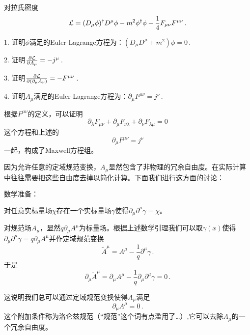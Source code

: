 \documentclass[CJK]{beamer}
\begin{document}
\begin{frame}
\bch
对拉氏密度
$${\mathcal{L}} = (D_\mu\phi)^\dagger D^\mu\phi - m^2\phi^\dagger \phi - \frac{1}{4} F_{\mu\nu}F^{\mu\nu} \,.$$

1. 证明$\phi$满足的Euler-Lagrange方程为：$(D_\mu D^\mu + m^2)\phi = 0\,$.

2. 证明$\frac{\partial{\mathcal{L}}}{\partial A_\mu} = - j^\mu\,$.

3. 证明$\frac{\partial{\mathcal{L}}}{\partial (\partial_\mu A_\nu)} = - F^{\mu\nu}\,$.

4. 证明$A_\mu$满足的Euler-Lagrange方程为：$\partial_\mu F^{\mu\nu} = j^\nu\,$.
\ech
\end{frame}


\begin{frame}
\bch
根据$F^{\mu\nu}$的定义，可以证明
$$\partial_\lambda F_{\mu\nu} + \partial_\mu F_{\nu\lambda} + \partial_\nu F_{\lambda\mu} = 0$$
这个方程和上述的
$$\partial_\mu F^{\mu\nu} = j^\nu $$
一起，构成了Maxwell方程组。
\ech
\end{frame}


\begin{frame}
\bch

因为允许任意的定域规范变换，$A_\mu$显然包含了非物理的冗余自由度。在实际计算中往往需要把这些自由度去掉以简化计算。下面我们进行这方面的讨论：

\skipline

数学准备：

对任意实标量场$\chi$存在一个实标量场$\gamma$使得$\partial_\mu \partial^\mu \gamma = \chi$。


\ech
\end{frame}


\begin{frame}
\bch
对规范场$A_\mu$，显然$q\partial_\mu A^\mu$为标量场。根据上述数学引理我们可以取$\gamma(x)$使得$\partial_\mu \partial^\mu \gamma = q\partial_\mu A^\mu$并作定域规范变换
$$\tilde{A}^\mu = A^\mu - \frac{1}{q}\partial^\mu \gamma\, .$$
于是
$$\partial_\mu \tilde{A}^\mu = \partial_\mu A^\mu - \frac{1}{q}\partial_\mu\partial^\mu \gamma = 0 \, .$$

\skipline
这说明我们总可以通过定域规范变换使得$A_\mu$满足
$$\partial_\mu A^\mu = 0\, .$$
这个附加条件称为洛仑兹规范（“规范”这个词有点滥用了…）,它可以去除$A_\mu$的一个冗余自由度。

\ech
\end{frame}
\end{document}
